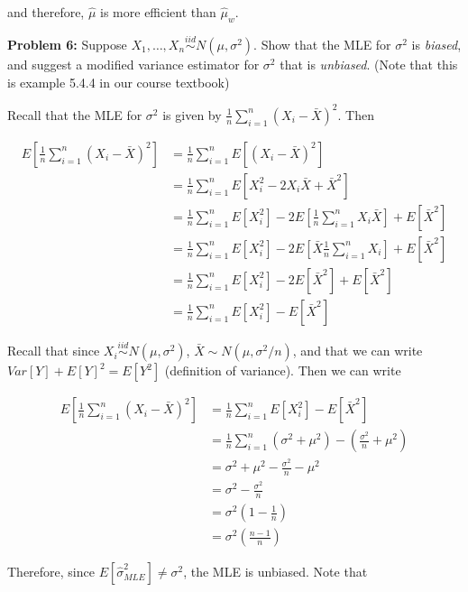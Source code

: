 \documentclass[
  letterpaper,
  DIV=11,
  numbers=noendperiod]{scrreprt}
\begin{document}
and therefore, \(\hat{\mu}\) is more efficient than \(\hat{\mu}_w\).

\textbf{Problem 6:} Suppose
\(X_1, \dots, X_n \overset{iid}{\sim} N(\mu, \sigma^2)\). Show that the
MLE for \(\sigma^2\) is \emph{biased}, and suggest a modified variance
estimator for \(\sigma^2\) that is \emph{unbiased}. (Note that this is
example 5.4.4 in our course textbook)

Recall that the MLE for \(\sigma^2\) is given by
\(\frac{1}{n} \sum_{i = 1}^n (X_i - \bar{X})^2\). Then

\begin{align*}
    E\left[ \frac{1}{n} \sum_{i = 1}^n (X_i - \bar{X})^2\right] & = \frac{1}{n} \sum_{i = 1}^n E\left[ (X_i - \bar{X})^2\right] \\
    & = \frac{1}{n} \sum_{i = 1}^n E\left[ X_i^2 - 2X_i \bar{X} + \bar{X}^2\right] \\
    & = \frac{1}{n} \sum_{i = 1}^n E[X_i^2] - 2 E\left[ \frac{1}{n} \sum_{i = 1}^n X_i \bar{X} \right] + E[\bar{X}^2] \\
    & = \frac{1}{n} \sum_{i = 1}^n E[X_i^2] - 2 E\left[ \bar{X} \frac{1}{n} \sum_{i = 1}^n X_i  \right] + E[\bar{X}^2] \\
    & = \frac{1}{n} \sum_{i = 1}^n E[X_i^2] - 2 E\left[ \bar{X}^2  \right] + E[\bar{X}^2] \\
    & = \frac{1}{n} \sum_{i = 1}^n E[X_i^2] - E\left[ \bar{X}^2  \right] 
\end{align*}

Recall that since \(X_i \overset{iid}{\sim} N(\mu, \sigma^2)\),
\(\bar{X} \sim N(\mu, \sigma^2/n)\), and that we can write
\(Var[Y] + E[Y]^2 = E[Y^2]\) (definition of variance). Then we can write

\begin{align*}
    E\left[ \frac{1}{n} \sum_{i = 1}^n (X_i - \bar{X})^2 \right] & = \frac{1}{n} \sum_{i = 1}^n E[X_i^2] - E\left[ \bar{X}^2  \right] \\
    & = \frac{1}{n} \sum_{i = 1}^n \left( \sigma^2 + \mu^2 \right) - \left( \frac{\sigma^2}{n} + \mu^2 \right) \\
    & = \sigma^2 + \mu^2 - \frac{\sigma^2}{n} - \mu^2  \\
    & = \sigma^2 - \frac{\sigma^2}{n} \\
    & = \sigma^2 \left( 1 - \frac{1}{n} \right) \\
    & = \sigma^2  \left( \frac{n-1}{n} \right)
\end{align*}

Therefore, since \(E[\hat{\sigma}^2_{MLE}] \neq \sigma^2\), the MLE is
unbiased. Note that
\end{document}
